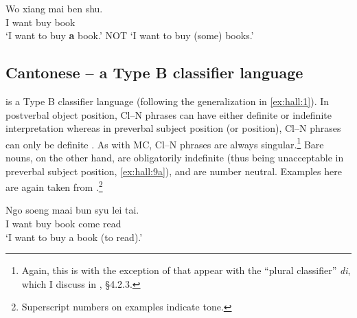 \documentclass[output=paper
,modfonts
,nonflat]{langsci/langscibook}
\begin{document}
\ea \label{ex:hall:6}
\gll 
Wo xiang mai ben shu.\\
I want buy {} book\\
\glt 
`I want to buy \textbf{a} book.' NOT `I want to buy (some) books.'\\
\z

\ea \label{ex:hall:7}
\z
\z

\subsection{Cantonese -- a Type B classifier language}

 is a Type B classifier language (following the generalization in \ref{ex:hall:1}). In postverbal object position, Cl--N phrases can have either definite or indefinite interpretation  whereas in preverbal subject position (or  position), Cl--N phrases can only be definite . As with MC, Cl--N phrases are always singular.\footnote{Again, this is with the exception of  that appear with the ``plural classifier'' \textit{di}, which I discuss in \citet{Hall2015}, \S4.2.3.} Bare nouns, on the other hand, are obligatorily indefinite (thus being unacceptable in preverbal subject position, \ref{ex:hall:9a}), and are number neutral. Examples here are again taken from \citet{ChengSybesma1999}.\footnote{Superscript numbers on  examples indicate tone.}

\ea \label{ex:hall:8}
\gll
Ngo soeng maai bun syu {\op}lei tai. \\
I want buy {} book \phantom{(}come read\\
\glt 
`I want to buy a book (to read).'\\
\z

\ea \label{ex:hall:9}
\z
\z
\end{document}
